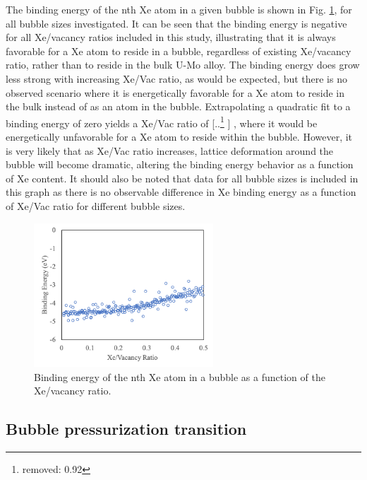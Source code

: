 \documentclass[review]{elsarticle}
\providecommand{\DIFaddtex}[1]{{\protect\color{blue} \sf #1}} %
\providecommand{\DIFdeltex}[1]{{\protect\color{red} [..\footnote{removed: #1} ]}} %
\providecommand{\DIFaddbegin}{} %
\providecommand{\DIFaddend}{} %
\providecommand{\DIFdelbegin}{} %
\providecommand{\DIFdelend}{} %
\providecommand{\DIFadd}[1]{\texorpdfstring{\DIFaddtex{#1}}{#1}} %
\providecommand{\DIFdel}[1]{\texorpdfstring{\DIFdeltex{#1}}{}} %
\newcommand{\DIFscaledelfig}{0.5}
\newlength{\DIFdelgraphicswidth} %
\newlength{\DIFdelgraphicsheight} %
\newcommand{\DIFaddincludegraphics}[2][]{{\color{blue}\fbox{\DIFOincludegraphics[#1]{#2}}}} %
\newcommand{\DIFdelincludegraphics}[2][]{%
\sbox{\DIFdelgraphicsbox}{\DIFOincludegraphics[#1]{#2}}%
\settoboxwidth{\DIFdelgraphicswidth}{\DIFdelgraphicsbox} %
\settoboxtotalheight{\DIFdelgraphicsheight}{\DIFdelgraphicsbox} %
\scalebox{\DIFscaledelfig}{%
\parbox[b]{\DIFdelgraphicswidth}{\usebox{\DIFdelgraphicsbox}\\[-\baselineskip] \rule{\DIFdelgraphicswidth}{0em}}\llap{\resizebox{\DIFdelgraphicswidth}{\DIFdelgraphicsheight}{%
\setlength{\unitlength}{\DIFdelgraphicswidth}%
\begin{picture}(1,1)%
\thicklines\linethickness{2pt} %
{\color[rgb]{1,0,0}\put(0,0){\framebox(1,1){}}}%
{\color[rgb]{1,0,0}\put(0,0){\line( 1,1){1}}}%
{\color[rgb]{1,0,0}\put(0,1){\line(1,-1){1}}}%
\end{picture}%
}\hspace*{3pt}}} %
} %
\DeclareRobustCommand{\DIFaddbegin}{\DIFOaddbegin \let\includegraphics\DIFaddincludegraphics} %
\DeclareRobustCommand{\DIFaddend}{\DIFOaddend \let\includegraphics\DIFOincludegraphics} %
\DeclareRobustCommand{\DIFdelbegin}{\DIFOdelbegin \let\includegraphics\DIFdelincludegraphics} %
\DeclareRobustCommand{\DIFdelend}{\DIFOaddend \let\includegraphics\DIFOincludegraphics} %
\begin{document}
\DIFaddend The binding energy of the nth Xe atom in a given bubble is shown in Fig. \ref{fig:binding}, for all bubble sizes investigated. It can be seen that the binding energy is negative for all Xe/vacancy ratios included in this study, illustrating that it is always favorable for a Xe atom to reside in a bubble, regardless of existing Xe/vacancy ratio, rather than to reside in the bulk U-Mo alloy. The binding energy does grow less strong with increasing Xe/Vac ratio, as would be expected, but there is no observed scenario where it is energetically favorable for a Xe atom to reside in the bulk instead of as an atom in the bubble. Extrapolating a quadratic fit to a binding energy of zero yields a Xe/Vac ratio of \DIFdelbegin \DIFdel{0.92}\DIFdelend \DIFaddbegin \DIFadd{0.94}\DIFaddend , where it would be energetically unfavorable for a Xe atom to reside within the bubble. However, it is very likely that as Xe/Vac ratio increases, lattice deformation around the bubble will become dramatic, altering the binding energy behavior as a function of Xe content. It should also be noted that data for all bubble sizes is included in this graph as there is no observable difference in Xe binding energy as a function of Xe/Vac ratio for different bubble sizes. 

\begin{figure}[h]
 \centering
 \includegraphics[width=0.6\textwidth]{4_binding.png} 
 \caption{Binding energy of the nth Xe atom in a bubble as a function of the Xe/vacancy ratio.}
 \label{fig:binding}
\end{figure}

\FloatBarrier

\subsection{Bubble pressurization transition}
\end{document}
